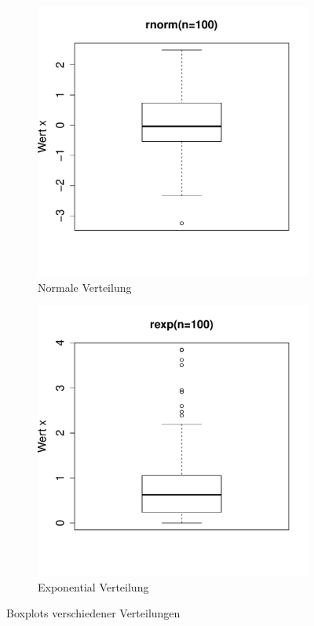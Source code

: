 \begin{figure}[h!]
\begin{subfigure}[b]{0.48\textwidth}
\includegraphics{r-cmd-032}
\caption{Normale Verteilung}
\end{subfigure}
\begin{subfigure}[b]{0.48\textwidth}
\includegraphics{r-cmd-033}
\caption{Exponential Verteilung}
\end{subfigure}
\caption{Boxplots verschiedener Verteilungen}
\end{figure}

